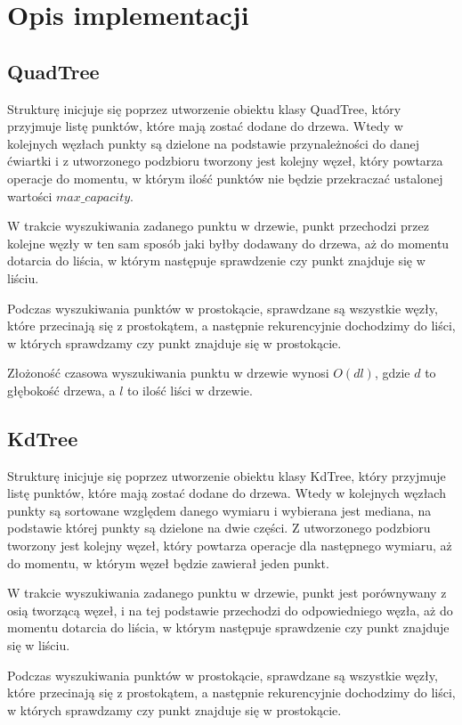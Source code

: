 \documentclass{lab}
\begin{document}
\section{Opis implementacji}
\subsection{QuadTree}
Strukturę inicjuje się poprzez utworzenie obiektu klasy QuadTree, który przyjmuje listę punktów, które mają zostać dodane do drzewa.
Wtedy w kolejnych węzłach punkty są dzielone na podstawie przynależności do danej ćwiartki i z utworzonego podzbioru tworzony jest kolejny węzeł, 
który powtarza operacje do momentu, w którym ilość punktów nie będzie przekraczać ustalonej wartości $max\_capacity$.

W trakcie wyszukiwania zadanego punktu w drzewie, punkt przechodzi przez kolejne węzły w ten sam sposób jaki byłby dodawany do drzewa, aż do momentu dotarcia do liścia,
w którym następuje sprawdzenie czy punkt znajduje się w liściu.

Podczas wyszukiwania punktów w prostokącie, sprawdzane są wszystkie węzły, które przecinają się z prostokątem, a następnie rekurencyjnie dochodzimy do liści,
w których sprawdzamy czy punkt znajduje się w prostokącie.

Złożoność czasowa wyszukiwania punktu w drzewie wynosi $O(dl)$, gdzie $d$ to głębokość drzewa, a $l$ to ilość liści w drzewie.

\subsection{KdTree}
Strukturę inicjuje się poprzez utworzenie obiektu klasy KdTree, który przyjmuje listę punktów, które mają zostać dodane do drzewa.
Wtedy w kolejnych węzłach punkty są sortowane względem danego wymiaru i wybierana jest mediana, na podstawie której punkty są dzielone na dwie części.
Z utworzonego podzbioru tworzony jest kolejny węzeł, który powtarza operacje dla następnego wymiaru, aż do momentu, w którym węzeł będzie zawierał jeden punkt.

W trakcie wyszukiwania zadanego punktu w drzewie, punkt jest porównywany z osią tworzącą węzeł, i na tej podstawie przechodzi do odpowiedniego węzła,
aż do momentu dotarcia do liścia, w którym następuje sprawdzenie czy punkt znajduje się w liściu.

Podczas wyszukiwania punktów w prostokącie, sprawdzane są wszystkie węzły, które przecinają się z prostokątem, a następnie rekurencyjnie dochodzimy do liści,
w których sprawdzamy czy punkt znajduje się w prostokącie.
\end{document}
